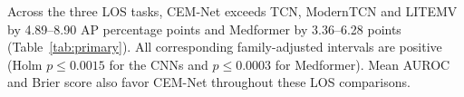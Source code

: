Across the three LOS tasks, CEM-Net exceeds TCN, ModernTCN and LITEMV by 4.89--8.90 AP percentage points and Medformer by 3.36--6.28 points (Table~\ref{tab:primary}). All corresponding family-adjusted intervals are positive (Holm $p\leq 0.0015$ for the CNNs and $p\leq 0.0003$ for Medformer). Mean AUROC and Brier score also favor CEM-Net throughout these LOS comparisons.
